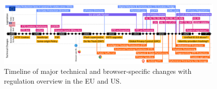 \begin{figure}[t]
    \centering
    \includegraphics[width=\textwidth]{figures/timeline.pdf}
    \caption{Timeline of major technical and browser-specific changes with regulation overview in the EU and US.}
    \label{fig:timeline}
    \vspace{-4mm}
\end{figure}